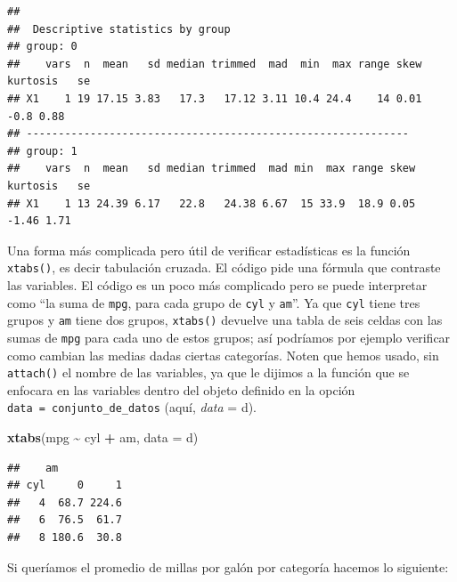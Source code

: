 \documentclass[
]{article}
\newenvironment{Shaded}{\begin{snugshade}}{\end{snugshade}}
\newcommand{\AttributeTok}[1]{\textcolor[rgb]{0.13,0.29,0.53}{#1}}
\newcommand{\CommentTok}[1]{\textcolor[rgb]{0.56,0.35,0.01}{\textit{#1}}}
\newcommand{\FunctionTok}[1]{\textcolor[rgb]{0.13,0.29,0.53}{\textbf{#1}}}
\newcommand{\NormalTok}[1]{#1}
\newcommand{\SpecialCharTok}[1]{\textcolor[rgb]{0.81,0.36,0.00}{\textbf{#1}}}
\begin{document}
\begin{Shaded}
\end{Shaded}

\begin{verbatim}
## 
##  Descriptive statistics by group 
## group: 0
##    vars  n  mean   sd median trimmed  mad  min  max range skew kurtosis   se
## X1    1 19 17.15 3.83   17.3   17.12 3.11 10.4 24.4    14 0.01     -0.8 0.88
## ------------------------------------------------------------ 
## group: 1
##    vars  n  mean   sd median trimmed  mad min  max range skew kurtosis   se
## X1    1 13 24.39 6.17   22.8   24.38 6.67  15 33.9  18.9 0.05    -1.46 1.71
\end{verbatim}

Una forma más complicada pero útil de verificar estadísticas es la
función \texttt{xtabs()}, es decir tabulación cruzada. El código pide
una fórmula que contraste las variables. El código es un poco más
complicado pero se puede interpretar como ``la suma de \texttt{mpg},
para cada grupo de \texttt{cyl} y \texttt{am}''. Ya que \texttt{cyl}
tiene tres grupos y \texttt{am} tiene dos grupos, \texttt{xtabs()}
devuelve una tabla de seis celdas con las sumas de \texttt{mpg} para
cada uno de estos grupos; así podríamos por ejemplo verificar como
cambian las medias dadas ciertas categorías. Noten que hemos usado, sin
\texttt{attach()} el nombre de las variables, ya que le dijimos a la
función que se enfocara en las variables dentro del objeto definido en
la opción \texttt{data\ =\ conjunto\_de\_datos} (aquí, \emph{data} = d).

\begin{Shaded}
\begin{Highlighting}[]
\FunctionTok{xtabs}\NormalTok{(mpg }\SpecialCharTok{\textasciitilde{}}\NormalTok{ cyl }\SpecialCharTok{+}\NormalTok{ am, }\AttributeTok{data =}\NormalTok{ d)}
\end{Highlighting}
\end{Shaded}

\begin{verbatim}
##    am
## cyl     0     1
##   4  68.7 224.6
##   6  76.5  61.7
##   8 180.6  30.8
\end{verbatim}

Si queríamos el promedio de millas por galón por categoría hacemos lo
siguiente:
\end{document}
